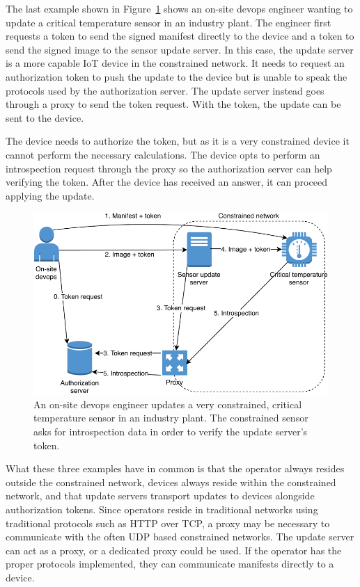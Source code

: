 \documentclass[0-thesis.tex]{subfiles}
\begin{document}
The last example shown in Figure~\ref{fig:industry} shows an on-site devops engineer
wanting to update a critical temperature sensor in an industry plant. The engineer first
requests a token to send the signed manifest directly to the device and a token to send
the signed image to the sensor update server. In this case, the update server is a more
capable IoT device in the constrained network. It needs to request an authorization token
to push the update to the device but is unable to speak the protocols used by the
authorization server. The update server instead goes through a proxy to send the token
request. With the token, the update can be sent to the device.

The device needs to authorize the token, but as it is a very constrained device it cannot
perform the necessary calculations. The device opts to perform an introspection request
through the proxy so the authorization server can help verifying the token. After the
device has received an answer, it can proceed applying the update.

\begin{figure}
    \caption{An on-site devops engineer updates a very constrained, critical temperature
                sensor in an industry plant. The constrained sensor asks for introspection
                data in order to verify the update server's token.}
    \label{fig:industry}
    \includegraphics{images/use-case-industry.pdf}
\end{figure}

What these three examples have in common is that the operator always resides outside the
constrained network, devices always reside within the constrained network, and that
update servers transport updates to devices alongside authorization tokens. Since operators
reside in traditional networks using traditional protocols such as HTTP over TCP, a proxy
may be necessary to communicate with the often UDP based constrained networks. The update
server can act as a proxy, or a dedicated proxy could be used. If the operator has the
proper protocols implemented, they can communicate manifests directly to a device.
\end{document}

